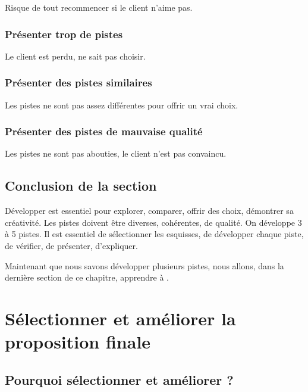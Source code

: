 Risque de tout recommencer si le client n'aime pas.

\subsubsection{Présenter trop de pistes}

Le client est perdu, ne sait pas choisir.

\subsubsection{Présenter des pistes similaires}

Les pistes ne sont pas assez différentes pour offrir un vrai choix.

\subsubsection{Présenter des pistes de mauvaise qualité}

Les pistes ne sont pas abouties, le client n'est pas convaincu.

\subsection*{Conclusion de la section}

Développer  est essentiel pour explorer, comparer, offrir des choix, démontrer sa créativité. Les pistes doivent être diverses, cohérentes, de qualité. On développe 3 à 5 pistes. Il est essentiel de sélectionner les esquisses, de développer chaque piste, de vérifier, de présenter, d'expliquer.

Maintenant que nous savons développer plusieurs pistes, nous allons, dans la dernière section de ce chapitre, apprendre à .

\section{Sélectionner et améliorer la proposition finale}

\subsection{Pourquoi sélectionner et améliorer ?}


